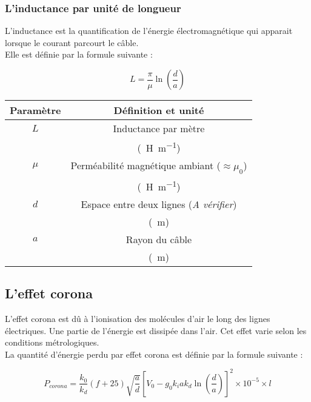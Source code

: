 \subsubsection{L'inductance par unité de longueur}
L'inductance est la quantification de l'énergie électromagnétique qui apparait lorsque le courant parcourt le câble.\\

Elle est définie par la formule suivante :

\[L=\frac{\pi}{\mu}\ln(\frac{d}{a})\]

\begin{center}
	\begin{tabular}{|c|c|}
		\hline 
		Paramètre & Définition et unité \\
		\hline
		$L$ & Inductance par mètre \\
		& (\SI[per-mode = symbol]{}{\henry\per\m}) \\
		\hline
		$\mu$ & Perméabilité magnétique ambiant ($\approx \mu_0$) \\
		& (\SI[per-mode = symbol]{}{\henry\per\m}) \\
		\hline
		$d$ & Espace entre deux lignes (\emph{A vérifier}) \\ 
		& (\SI{}{\m}) \\
		\hline
		$a$ & Rayon du câble \\
		& (\SI{}{\m}) \\
		\hline
	\end{tabular}
\end{center}

\subsection{L'effet corona}
L'effet corona est dû à l'ionisation des molécules d'air le long des lignes électriques. Une partie de l'énergie est dissipée dans l'air. Cet effet varie selon les conditions métrologiques.\\

La quantité d'énergie perdu par effet corona est définie par la formule suivante :

\[P_{corona}=\frac{k_0}{k_d}(f + 25)\sqrt{\frac{a}{d}}[V_0 - g_0k_iak_d\ln(\frac{d}{a})]^2 \times 10^{-5} \times l\]

